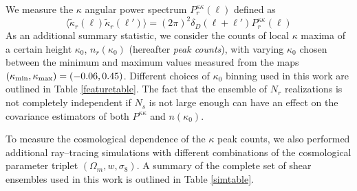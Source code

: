 \documentclass[reprint,aps,prd,superscriptaddress,showkeys,showpacs]{revtex4-1}
\begin{document}
We measure the $\kappa$ angular power spectrum $P^{\kappa\kappa}_r(\ell)$ defined as
\begin{equation}
\langle\tilde{\kappa}_r(\pmb{\ell})\tilde{\kappa}_r(\pmb{\ell}')\rangle = (2\pi)^2\delta_D(\pmb{\ell}+\pmb{\ell}')P^{\kappa\kappa}_r(\ell)
\end{equation}
%
As an additional summary statistic, we consider the counts of local
$\kappa$ maxima of a certain height $\kappa_0$, $n_r(\kappa_0)$
(hereafter \textit{peak counts}), with varying $\kappa_0$ chosen between the minimum and maximum values measured from the maps $(\kappa_{\rm min},\kappa_{\rm max})=(-0.06,0.45)$. Different choices of $\kappa_0$ binning used in this work are outlined in Table \ref{featuretable}. 
The fact that the ensemble of $N_r$ realizations is not completely
independent if $N_s$ is not large enough can have an effect on the
covariance estimators of both $P^{\kappa\kappa}$ and $n(\kappa_0)$.


To measure the cosmological dependence of the $\kappa$ peak counts, we also performed additional ray--tracing simulations with different combinations of the cosmological parameter triplet $(\Omega_m,w,\sigma_8)$. A summary of the complete set of shear ensembles used in this work is outlined in Table \ref{simtable}.
\end{document}
